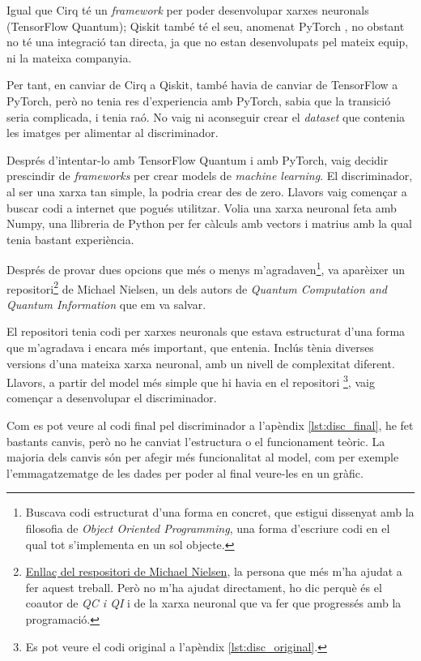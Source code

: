 Igual que Cirq té un \textit{framework} per poder desenvolupar xarxes neuronals (TensorFlow Quantum); Qiskit també té el seu, anomenat PyTorch \cite{pytorch_2019}, no obstant no té una integració tan directa, ja que no estan desenvolupats pel mateix equip, ni la mateixa companyia.

Per tant, en canviar de Cirq a Qiskit, també havia de canviar de TensorFlow a PyTorch, però no tenia res d'experiencia amb PyTorch, sabia que la transició seria complicada, i tenia raó. No vaig ni aconseguir crear el \textit{dataset} que contenia les imatges per alimentar al discriminador.

Després d'intentar-lo amb TensorFlow Quantum i amb PyTorch, vaig decidir prescindir de \textit{frameworks} per crear models de \textit{machine learning}. El discriminador, al ser una xarxa tan simple, la podria crear des de zero. Llavors vaig començar a buscar codi a internet que pogués utilitzar. Volia una xarxa neuronal feta amb Numpy, una llibreria de Python per fer càlculs amb vectors i matrius amb la qual tenia bastant experiència.

Després de provar dues opcions que més o menys m'agradaven\footnote{Buscava codi estructurat d'una forma en concret, que estigui dissenyat amb la filosofia de \textit{Object Oriented Programming}, una forma d'escriure codi en el qual tot s'implementa en un sol objecte.}, va aparèixer un repositori\footnote{\href{https://github.com/mnielsen/neural-networks-and-deep-learning}{Enllaç del respositori de Michael Nielsen}, la persona que més m'ha ajudat a fer aquest treball. Però no m'ha ajudat directament, ho dic perquè és el coautor de \textit{QC i QI} \cite{QCandQI} i de la xarxa neuronal que va fer que progressés amb la programació. } de Michael Nielsen, un dels autors de \textit{Quantum Computation and Quantum Information} \cite{QCandQI} que em va salvar. 

El repositori tenia codi per xarxes neuronals que estava estructurat d'una forma que m'agradava i encara més important, que entenia. Inclús tènia diverses versions d'una mateixa xarxa neuronal, amb un nivell de complexitat diferent. Llavors, a partir del model més simple que hi havia en el repositori \footnote{Es pot veure el codi original a l'apèndix \ref{lst:disc_original}.}, vaig començar a desenvolupar el discriminador.

Com es pot veure al codi final pel discriminador a l'apèndix \ref{lst:disc_final}, he fet bastants canvis, però no he canviat l'estructura o el funcionament teòric. La majoria dels canvis són per afegir més funcionalitat al model, com per exemple l'emmagatzematge de les dades per poder al final veure-les en un gràfic.

